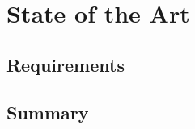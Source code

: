 \chapter{State of the Art}
\label{chap:stateOfTheArt}


\section{Requirements}
\label{sec:sota-requirements}


\section{Summary}
